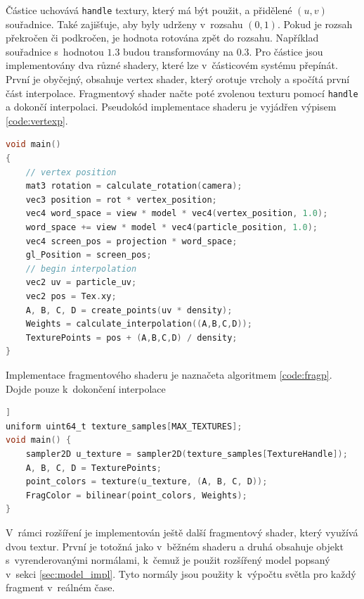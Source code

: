 Částice uchovává \texttt{handle} textury, který má být použit, a přidělené $(u,v)$ souřadnice. Také zajišťuje, aby byly udrženy v~rozsahu $(0,1)$. Pokud je rozsah překročen či podkročen, je hodnota rotována zpět do rozsahu. Například souřadnice s~hodnotou $1.3$ budou transformovány na $0.3$.
Pro částice jsou implementovány dva různé shadery, které lze v~částicovém systému přepínát. První je obyčejný, obsahuje vertex shader, který orotuje vrcholy a spočítá první část interpolace. Fragmentový shader načte poté zvolenou texturu pomocí \texttt{handle} a dokončí interpolaci. Pseudokód implementace shaderu je vyjádřen výpisem \ref{code:vertexp}.
\begin{lstlisting}[caption={Pseudokód vertex shaderu částic (zjednodušeno)}, label={code:vertexp}, language=C]
void main()
{
    // vertex position
    mat3 rotation = calculate_rotation(camera);
    vec3 position = rot * vertex_position;
    vec4 word_space = view * model * vec4(vertex_position, 1.0);
    word_space += view * model * vec4(particle_position, 1.0);
    vec4 screen_pos = projection * word_space;
    gl_Position = screen_pos;
    // begin interpolation
    vec2 uv = particle_uv;
    vec2 pos = Tex.xy;
    A, B, C, D = create_points(uv * density);
    Weights = calculate_interpolation((A,B,C,D));
    TexturePoints = pos + (A,B,C,D) / density;
}
\end{lstlisting}
Implementace fragmentového shaderu je naznačeta algoritmem \ref{code:fragp}. Dojde pouze k~dokončení interpolace
\begin{lstlisting}[caption={Pseudokód fragmentového shaderu částic (zjednodušeno)}, label={code:fragp}, language=C]]
uniform uint64_t texture_samples[MAX_TEXTURES];
void main() {
    sampler2D u_texture = sampler2D(texture_samples[TextureHandle]);
    A, B, C, D = TexturePoints;
    point_colors = texture(u_texture, (A, B, C, D));
    FragColor = bilinear(point_colors, Weights);
}
\end{lstlisting}
V~rámci rozšíření je implementován ještě další fragmentový shader, který využívá dvou textur. První je totožná jako v~běžném shaderu a druhá obsahuje objekt s~vyrenderovanými normálami, k~čemuž je použit rozšířený model popsaný v~sekci \ref{sec:model_impl}. Tyto normály jsou použity k~výpočtu světla pro každý fragment v~reálném čase. 
    
